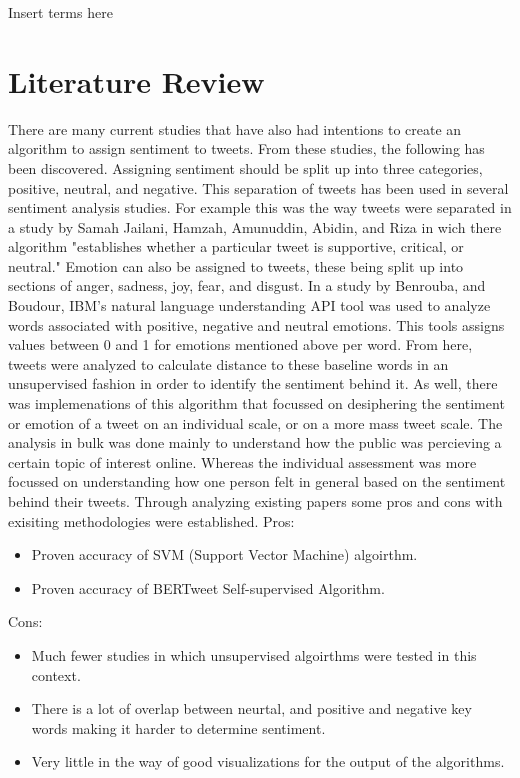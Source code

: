 \documentclass[conference]{IEEEtran}
\begin{document}
\begin{IEEEkeywords}
Insert terms here
\end{IEEEkeywords}

\section{Literature Review}
There are many current studies that have also had intentions to create an algorithm to assign sentiment to tweets.  
From these studies, the following has been discovered.
Assigning sentiment should be split up into three categories, positive, neutral, and negative.
This separation of tweets has been used in several sentiment analysis studies.
For example this was the way tweets were separated in a study by Samah Jailani, Hamzah, Amunuddin, Abidin, and Riza in wich there algorithm "establishes whether a particular tweet is supportive, critical, or neutral\cite{b2}."
Emotion can also be assigned to tweets, these being split up into sections of anger, sadness, joy, fear, and disgust. 
In a study by Benrouba, and Boudour, IBM's natural language understanding API tool was used to analyze words associated with positive, negative and neutral emotions\cite{b1}.
This tools assigns values between 0 and 1 for emotions mentioned above per word. 
From here, tweets were analyzed to calculate distance to these baseline words in an unsupervised fashion in order to identify the sentiment behind it. 
As well, there was implemenations of this algorithm that focussed on desiphering the sentiment or emotion of a tweet on an individual scale, or on a more mass tweet scale.
The analysis in bulk was done mainly to understand how the public was percieving a certain topic of interest online. 
Whereas the individual assessment was more focussed on understanding how one person felt in general based on the sentiment behind their tweets. 
Through analyzing existing papers some pros and cons with exisiting methodologies were established. \newline
\newline
Pros: 
\begin{itemize}
    \item Proven accuracy of SVM (Support Vector Machine) algoirthm.
    \item Proven accuracy of BERTweet Self-supervised Algorithm.
\end{itemize}
Cons:
\begin{itemize}
    \item Much fewer studies in which unsupervised algoirthms were tested in this context.
    \item There is a lot of overlap between neurtal, and positive and negative key words making it harder to determine sentiment.
    \item Very little in the way of good visualizations for the output of the algorithms.
\end{itemize}
\end{document}
